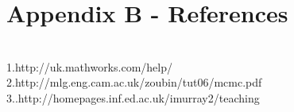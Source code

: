 \documentclass[english]{article}
\begin{document}

\medskip

\medskip

\medskip

\medskip

\medskip

\medskip





\section*{Appendix B - References}
\\
1.http://uk.mathworks.com/help/
\\
2.http://mlg.eng.cam.ac.uk/zoubin/tut06/mcmc.pdf
\\
3..http://homepages.inf.ed.ac.uk/imurray2/teaching
\end{document}
